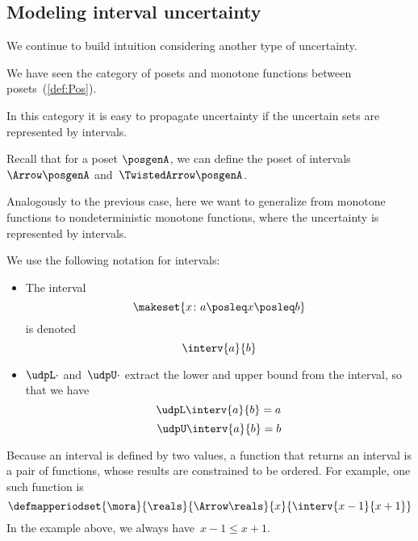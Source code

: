 \subsection{Modeling interval uncertainty}

We continue to build intuition considering another type of uncertainty.

We have seen the category \Pos of posets and monotone functions between posets~(\cref{def:Pos}).

In this category it is easy to propagate uncertainty if the uncertain sets are represented by intervals.

Recall that for a poset $\posgenA$, we can define the poset of intervals~$\Arrow\posgenA$ and~$\TwistedArrow\posgenA$.

Analogously to the previous case, here we want to generalize from monotone functions to nondeterministic monotone functions, where the uncertainty is represented by intervals.

We use the following notation for intervals:
\begin{itemize}
    \item The interval
          \begin{equation}
              \label{eq:interv-1}
              \makeset{x\colon a \posleq x \posleq b}
          \end{equation}
          is denoted
          \begin{equation}
              \label{eq:interv-2}
              \interv{a}{b}
          \end{equation}
    \item $\udpL\cdot$ and~$\udpU\cdot$ extract the lower and upper bound from the interval, so that we have
          \begin{equation}
              \label{eq:interv-L}
              \udpL \interv{a}{b} = a
          \end{equation}
          \begin{equation}
              \label{eq:interv-U}
              \udpU \interv{a}{b} = b
          \end{equation}
\end{itemize}
%
Because an interval is defined by two values, a function that returns an interval is a pair of functions, whose results are constrained to be ordered.
For example, one such function is
\begin{equation}
    \label{eq:interval-func-example}
    \defmapperiodset{\mora}{\reals}{\Arrow\reals}%
    {x}{ \interv{x-1}{x+1}
    }
\end{equation}
In the example above, we always have~$x-1\leq x+1$.

